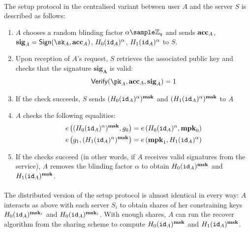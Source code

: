 		\paragraph{} The setup protocol in the centralised variant between user $A$ and the server $S$ is described as follows:
		\begin{enumerate}
			\item $A$ chooses a random blinding factor $\alpha \sample \mathbb{Z}_q$ and sends $\mathbf{acc}_A$, $\mathbf{sig}_A = \Sign(\sk_A, \acc_A)$, $H_0(\mathtt{id}_A)^\alpha$, $H_1(\mathtt{id}_A)^\alpha$ to $S$.
			\item Upon reception of $A$'s request, $S$ retrieves the associated public key and checks that the signature $\mathbf{sig_A}$ is valid:
			\begin{equation}
				\Verif(\pk_A, \acc_A, \mathbf{sig}_A) = 1
			\end{equation}
		\item If the check succeeds, $S$ sends $(H_0(\mathtt{id}_A)^\alpha)^{\mathbf{msk}}$ and $(H_1(\mathtt{id}_A)^\alpha)^{\mathbf{msk}}$ to $A$
		\item $A$ checks the following equalities:
		\begin{align}
			e\left((H_0(\mathtt{id}_A)^\alpha)^{\mathbf{msk}}, g_0 \right) &= e\left(H_0(\mathtt{id}_A)^\alpha, \mathbf{mpk}_0 \right) \\
			e\left(g_1, (H_1(\mathtt{id}_A)^\alpha)^{\mathbf{msk}} \right) &= e\left(\mathbf{mpk}_1, H_1(\mathtt{id}_A)^\alpha \right)
		\end{align}
		\item If the checks succeed (in other words, if $A$ receives valid signatures from the service), $A$ removes the blinding factor $\alpha$ to obtain $H_0(\mathtt{id}_A)^{\mathbf{msk}}$ and $H_1(\mathtt{id}_A)^{\mathbf{msk}}$.
		\end{enumerate}
		
		
	
	\paragraph{} The distributed version of the setup protocol is almost identical in every way: $A$ interacts as above with each server $S_i$ to obtain shares of her constraining keys $H_0(\mathtt{id}_A)^{\mathbf{msk}_i}$ and $H_0(\mathtt{id}_A)^{\mathbf{msk}_i}$. With enough shares, $A$ can run the recover algorithm from the sharing scheme to compute $H_0(\mathtt{id}_A)^{\mathbf{msk}}$ and $H_1(\mathtt{id}_A)^{\mathbf{msk}}$.
	
